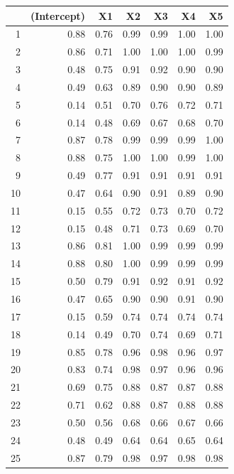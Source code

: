 \documentclass[authoryear, review, 11pt]{elsarticle}
\begin{document}
\begin{table}[ht]
\begin{center}
\begin{tabular}{rrrrrrr}
  \hline
 & (Intercept) & X1 & X2 & X3 & X4 & X5 \\ 
  \hline
1 & 0.88 & 0.76 & 0.99 & 0.99 & 1.00 & 1.00 \\ 
  2 & 0.86 & 0.71 & 1.00 & 1.00 & 1.00 & 0.99 \\ 
  3 & 0.48 & 0.75 & 0.91 & 0.92 & 0.90 & 0.90 \\ 
  4 & 0.49 & 0.63 & 0.89 & 0.90 & 0.90 & 0.89 \\ 
  5 & 0.14 & 0.51 & 0.70 & 0.76 & 0.72 & 0.71 \\ 
  6 & 0.14 & 0.48 & 0.69 & 0.67 & 0.68 & 0.70 \\ 
  7 & 0.87 & 0.78 & 0.99 & 0.99 & 0.99 & 1.00 \\ 
  8 & 0.88 & 0.75 & 1.00 & 1.00 & 0.99 & 1.00 \\ 
  9 & 0.49 & 0.77 & 0.91 & 0.91 & 0.91 & 0.91 \\ 
  10 & 0.47 & 0.64 & 0.90 & 0.91 & 0.89 & 0.90 \\ 
  11 & 0.15 & 0.55 & 0.72 & 0.73 & 0.70 & 0.72 \\ 
  12 & 0.15 & 0.48 & 0.71 & 0.73 & 0.69 & 0.70 \\ 
  13 & 0.86 & 0.81 & 1.00 & 0.99 & 0.99 & 0.99 \\ 
  14 & 0.88 & 0.80 & 1.00 & 0.99 & 0.99 & 0.99 \\ 
  15 & 0.50 & 0.79 & 0.91 & 0.92 & 0.91 & 0.92 \\ 
  16 & 0.47 & 0.65 & 0.90 & 0.90 & 0.91 & 0.90 \\ 
  17 & 0.15 & 0.59 & 0.74 & 0.74 & 0.74 & 0.74 \\ 
  18 & 0.14 & 0.49 & 0.70 & 0.74 & 0.69 & 0.71 \\ 
  19 & 0.85 & 0.78 & 0.96 & 0.98 & 0.96 & 0.97 \\ 
  20 & 0.83 & 0.74 & 0.98 & 0.97 & 0.96 & 0.96 \\ 
  21 & 0.69 & 0.75 & 0.88 & 0.87 & 0.87 & 0.88 \\ 
  22 & 0.71 & 0.62 & 0.88 & 0.87 & 0.88 & 0.88 \\ 
  23 & 0.50 & 0.56 & 0.68 & 0.66 & 0.67 & 0.66 \\ 
  24 & 0.48 & 0.49 & 0.64 & 0.64 & 0.65 & 0.64 \\ 
  25 & 0.87 & 0.79 & 0.98 & 0.97 & 0.98 & 0.98 \\ 

\end{tabular}
\end{center}
\end{table}
\end{document}
